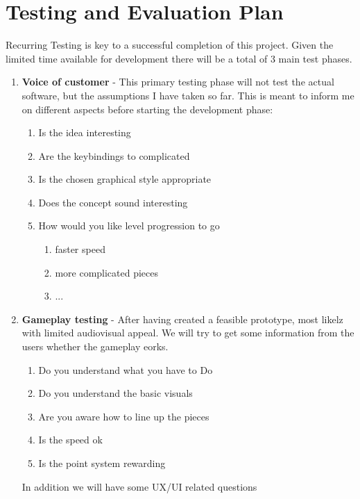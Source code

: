 \documentclass{article}
\begin{document}
\section{Testing and Evaluation Plan}
Recurring Testing is key to a successful completion of this project. Given the limited time available for development there will be a total of 3 main test phases.
\begin{enumerate}
    \item \textbf{Voice of customer} - This primary testing phase will not test the actual software, but the assumptions I have taken so far. This is meant to inform me on different aspects before starting the development phase:
            \begin{enumerate}
                \item Is the idea interesting
                \item Are the keybindings to complicated
                \item Is the chosen graphical style appropriate 
                \item Does the concept sound interesting
                \item How would you like level progression to go
                \begin{enumerate}
                    \item faster speed
                    \item more complicated pieces
                    \item ...
                \end{enumerate}
            \end{enumerate}
    \item \textbf{Gameplay testing} - After having created a feasible prototype, most likelz with limited audiovisual appeal. We will try to get some information from the users whether the gameplay eorks.
            \begin{enumerate}
                \item Do you understand what you have to Do
                \item Do you understand the basic visuals
                \item Are you aware how to line up the pieces
                \item Is the speed ok
                \item Is the point system rewarding
            \end{enumerate}
            In addition we will have some UX/UI related questions

\end{enumerate}
\end{document}
